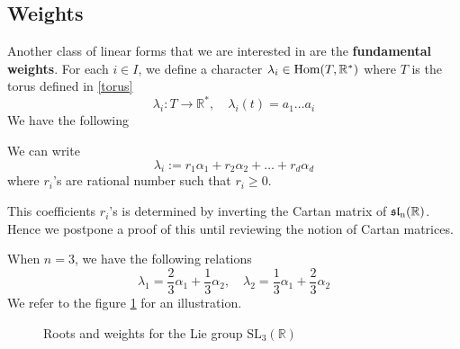 \subsection{Weights}
Another class of linear forms that we are interested in are the \textbf{fundamental weights}. For each $i \in I$, we define
a character $\lambda_i \in \operatorname{Hom}(T,\mathbb{R}^*)$ where $T$ is the torus defined in \ref{torus}
\[\lambda_i \colon T \to \mathbb{R}^*, \quad\lambda_i(t) = a_1\ldots a_i\]
We have the following
\begin{lemma}\label{linear-comb-of-weights}
    We can write
    \[\lambda_i := r_1\alpha_1 + r_2\alpha_2+\ldots + r_d\alpha_d\]
    where $r_i$'s are rational number such that $r_i \ge 0$.
\end{lemma}
This coefficients $r_i$'s is determined by inverting the Cartan matrix of $\operatorname{\mathfrak{sl}_n(\mathbb{R})}$. Hence we postpone a proof
of this until reviewing the notion of Cartan matrices.
\begin{example}
    When $n=3$, we have the following relations
    \[\lambda_1 = \dfrac{2}{3}\alpha_1+\dfrac{1}{3}\alpha_2, \quad \lambda_2 = \dfrac{1}{3}\alpha_1+\dfrac{2}{3}\alpha_2\]
    We refer to the figure \ref{A_2-rootsystem} for an illustration.
\end{example}
\begin{figure}[hbt]
    \centering
    \caption{Roots and weights for the Lie group $\text{SL}_3(\mathbb{R})$}
    \label{A_2-rootsystem}
\end{figure}


